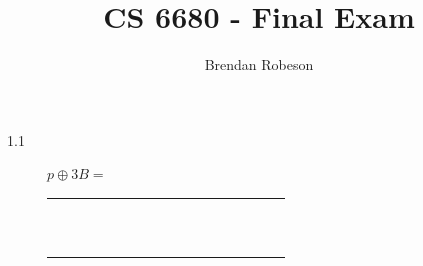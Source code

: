 \documentclass[fleqn]{article}
\begin{document}
\title{CS 6680 - Final Exam}
\author{Brendan Robeson}
\maketitle

\begin{description}

\item [1.1]
    \begin{math}p \oplus 3B =\end{math}

    \begin{tabular}{| c | c | c | c | c | c | c | c | c | c | c | c | c | c | c | c | c |}
        \hline
        & & & \cellcolor{gray} & \cellcolor{gray} & \cellcolor{gray} & \cellcolor{gray} & \cellcolor{gray} & \cellcolor{gray} & \cellcolor{gray} & & & & & & & \\ \hline
        & & & \cellcolor{gray} & \cellcolor{gray} & \cellcolor{gray} & \cellcolor{gray} & \cellcolor{gray} & \cellcolor{gray} & \cellcolor{gray} & & & & & & & \\ \hline
        & & & \cellcolor{gray} & \cellcolor{gray} & \cellcolor{gray} & \cellcolor{gray} & \cellcolor{gray} & \cellcolor{gray} & \cellcolor{gray} & & & & & & & \\ \hline
        & & & \cellcolor{gray} & \cellcolor{gray} & \cellcolor{gray} & \cellcolor{gray} & \cellcolor{gray} & \cellcolor{gray} & \cellcolor{gray} & & & & & & & \\ \hline
        & & & \cellcolor{gray} & \cellcolor{gray} & \cellcolor{gray} & \cellcolor{gray} & \cellcolor{gray} & \cellcolor{gray} & \cellcolor{gray} & & & & & & & \\ \hline
        & & & \cellcolor{gray} & \cellcolor{gray} & \cellcolor{gray} & \cellcolor{gray} & \cellcolor{gray} & \cellcolor{gray} & \cellcolor{gray} & & & & & & & \\ \hline
        & & & \cellcolor{gray} & \cellcolor{gray} & \cellcolor{gray} & \cellcolor{gray} & \cellcolor{gray} & \cellcolor{gray} & \cellcolor{gray} & & & & & & & \\ \hline
        & & & & & & & & & & & & & & & & \\ \hline
        & & & & & & & & & & & & & & & & \\ \hline
        & & & & & & & & & & & & & & & & \\ \hline
        & & & & & & & & & & & & & & & & \\ \hline
        & & & & & & & & & & & & & & & & \\ \hline
    \end{tabular}


\end{description}
\end{document}

